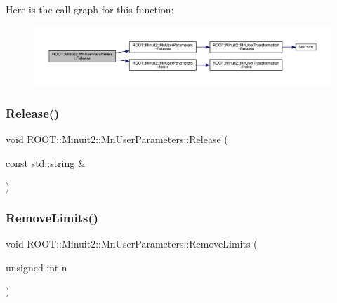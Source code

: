 Here is the call graph for this function\+:\nopagebreak
\begin{figure}[H]
\begin{center}
\leavevmode
\includegraphics[width=350pt]{d6/d10/classROOT_1_1Minuit2_1_1MnUserParameters_ac178a853a9641a88a9a1412224e6e105_cgraph}
\end{center}
\end{figure}
\mbox{\label{classROOT_1_1Minuit2_1_1MnUserParameters_ac178a853a9641a88a9a1412224e6e105}} 
\subsubsection{\texorpdfstring{Release()}{Release()}\hspace{0.1cm}{\footnotesize\ttfamily [4/4]}}
{\footnotesize\ttfamily void R\+O\+O\+T\+::\+Minuit2\+::\+Mn\+User\+Parameters\+::\+Release (\begin{DoxyParamCaption}\item[{const std\+::string \&}]{ }\end{DoxyParamCaption})}

\mbox{\label{classROOT_1_1Minuit2_1_1MnUserParameters_a399fd2fff4e1055c0878c8ce24205544}} 
\subsubsection{\texorpdfstring{RemoveLimits()}{RemoveLimits()}\hspace{0.1cm}{\footnotesize\ttfamily [1/4]}}
{\footnotesize\ttfamily void R\+O\+O\+T\+::\+Minuit2\+::\+Mn\+User\+Parameters\+::\+Remove\+Limits (\begin{DoxyParamCaption}\item[{unsigned int}]{n }\end{DoxyParamCaption})}

